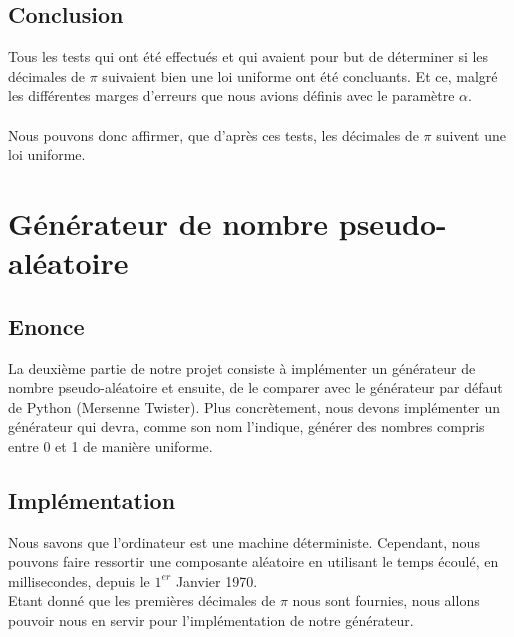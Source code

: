 \documentclass[french]{article}
\begin{document}
\subsection{Conclusion}
Tous les tests qui ont été effectués et qui avaient pour but de déterminer si les décimales de $\pi$ suivaient bien une loi uniforme ont été concluants. Et ce, malgré les différentes marges d'erreurs que nous avions définis avec le paramètre $\alpha$.
\\
\\
Nous pouvons donc affirmer, que d'après ces tests, les décimales de $\pi$ suivent une loi uniforme.
\newpage
\section{Générateur de nombre pseudo-aléatoire}
\subsection{Enonce}
La deuxième partie de notre projet consiste à implémenter un générateur de nombre pseudo-aléatoire et ensuite, de le comparer avec le générateur par défaut de Python (Mersenne Twister). Plus concrètement, nous devons implémenter un générateur qui devra, comme son nom l'indique, générer des nombres compris entre 0 et 1
de manière uniforme.

\subsection{Implémentation}
Nous savons que l'ordinateur est une machine déterministe. Cependant, nous pouvons faire ressortir une composante aléatoire en utilisant le temps écoulé, en millisecondes, depuis le $1^{er}$ Janvier 1970.
\\
Etant donné que les premières décimales de  $\pi$ nous sont fournies, nous allons pouvoir nous en servir pour l'implémentation de notre générateur.
\end{document}
